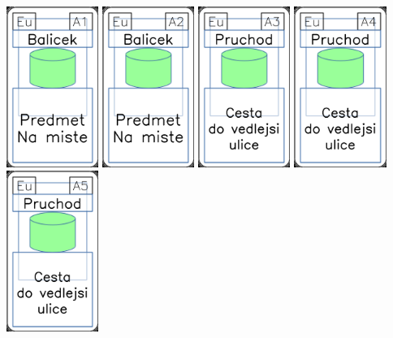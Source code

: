 \documentclass[a4paper]{article}
\begin{document}
	\includegraphics[width=3.0cm]{img-4_30}
	\includegraphics[width=3.0cm]{img-4_31}
	\includegraphics[width=3.0cm]{img-4_32}
	\includegraphics[width=3.0cm]{img-4_33}
	\includegraphics[width=3.0cm]{img-4_34}
\end{document}
